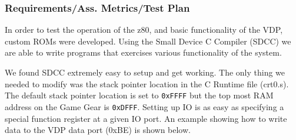 \documentclass[xcolor=table]{beamer}
\begin{document}
\begin{frame}
    \frametitle{Requirements/Ass. Metrics/Test Plan}
    In order to test the operation of the z80, and basic functionality of the VDP,
    custom ROMs were developed. Using the Small Device C Compiler (SDCC)
    \cite{SDCC} we are able to write programs that exercises various functionality
    of the system.

    We found SDCC extremely easy to setup and get working. The only thing we needed
    to modify was the stack pointer location in the C Runtime file (crt0.s). The
    default stack pointer location is set to \texttt{0xFFFF} but the top most RAM
    address on the Game Gear is \texttt{0xDFFF}. Setting up IO is as easy as
    specifying a special function register at a given IO port. An example showing
    how to write data to the VDP data port (0xBE) is shown below.
\end{frame}

%
%

%
\end{document}
